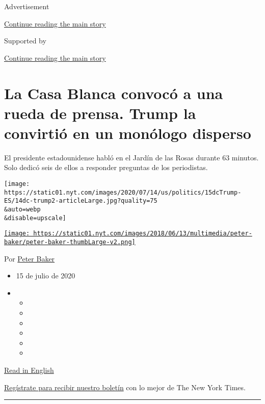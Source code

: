 Advertisement

\protect\hyperlink{after-top}{Continue reading the main story}

Supported by

\protect\hyperlink{after-sponsor}{Continue reading the main story}

\hypertarget{la-casa-blanca-convocuxf3-a-una-rueda-de-prensa-trump-la-convirtiuxf3-en-un-monuxf3logo-disperso}{%
\section{La Casa Blanca convocó a una rueda de prensa. Trump la
convirtió en un monólogo
disperso}\label{la-casa-blanca-convocuxf3-a-una-rueda-de-prensa-trump-la-convirtiuxf3-en-un-monuxf3logo-disperso}}

El presidente estadounidense habló en el Jardín de las Rosas durante 63
minutos. Solo dedicó seis de ellos a responder preguntas de los
periodistas.

\texttt{[image: https://static01.nyt.com/images/2020/07/14/us/politics/15dcTrump-ES/14dc-trump2-articleLarge.jpg?quality=75\\\&auto=webp\\\&disable=upscale]}

\href{https://www.nytimes.com/by/peter-baker}{\texttt{[image: https://static01.nyt.com/images/2018/06/13/multimedia/peter-baker/peter-baker-thumbLarge-v2.png]}}

Por \href{https://www.nytimes.com/by/peter-baker}{Peter Baker}

\begin{itemize}
\item
  15 de julio de 2020
\item
  \begin{itemize}
  \item
  \item
  \item
  \item
  \item
  \item
  \end{itemize}
\end{itemize}

\href{https://www.nytimes.com/2020/07/14/us/politics/trump-news-conference.html}{Read
in English}

\href{https://www.nytimes.com/newsletters/el-times}{Regístrate para
recibir nuestro boletín} con lo mejor de The New York Times.

\begin{center}\rule{0.5\linewidth}{\linethickness}\end{center}

